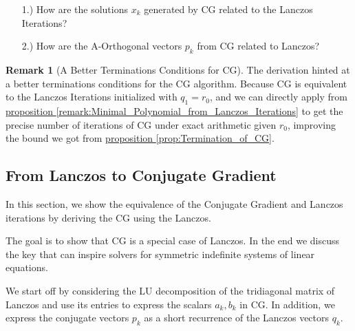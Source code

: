 \documentclass[]{article}
\theoremstyle{definition}
\newtheorem{remark}{Remark}[subsection]  %
\begin{document}
            \begin{enumerate}
                \item [1.)] How are the solutions $x_k$ generated by CG related to the Lanczos Iterations? 
                \item [2.)] How are the A-Orthogonal vectors $p_k$ from CG related to Lanczos? 
            \end{enumerate}
            \begin{remark}[A Better Terminations Conditions for CG]
                The derivation hinted at a better terminations conditions for the CG algorithm. Because CG is equivalent to the Lanczos Iterations initialized with $q_1 = r_0$, and we can directly apply from \hyperref[remark:Minimal_Polynomial_from_Lanczos_Iterations]{proposition \ref*{remark:Minimal_Polynomial_from_Lanczos_Iterations}} to get the precise number of iterations of CG under exact arithmetic given $r_0$, improving the bound we got from \hyperref[prop:Termination_of_CG]{proposition \ref*{prop:Termination_of_CG}}. 
            \end{remark}
    \subsection{From Lanczos to Conjugate Gradient}
            In this section, we show the equivalence of the Conjugate Gradient and Lanczos iterations by deriving the CG using the Lanczos. 
            \par
            The goal is to show that CG is a special case of Lanczos. In the end we discuss the key that can inspire solvers for symmetric indefinite systems of linear equations. 
            \par
            We start off by considering the LU decomposition of the tridiagonal matrix of Lanczos and use its entries to express the scalars $a_k, b_k$ in CG. In addition, we express the conjugate vectors $p_k$ as a short recurrence of the Lanczos vectors $q_k$. 
\end{document}
